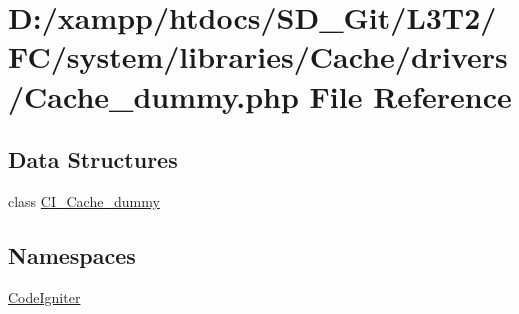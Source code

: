 \hypertarget{system_2libraries_2_cache_2drivers_2_cache__dummy_8php}{}\section{D\+:/xampp/htdocs/\+S\+D\+\_\+\+Git/\+L3\+T2/\+F\+C/system/libraries/\+Cache/drivers/\+Cache\+\_\+dummy.php File Reference}
\label{system_2libraries_2_cache_2drivers_2_cache__dummy_8php}
\subsection*{Data Structures}
\begin{DoxyCompactItemize}
\item 
class \hyperlink{class_c_i___cache__dummy}{C\+I\+\_\+\+Cache\+\_\+dummy}
\end{DoxyCompactItemize}
\subsection*{Namespaces}
\begin{DoxyCompactItemize}
\item 
 \hyperlink{namespace_code_igniter}{Code\+Igniter}
\end{DoxyCompactItemize}
